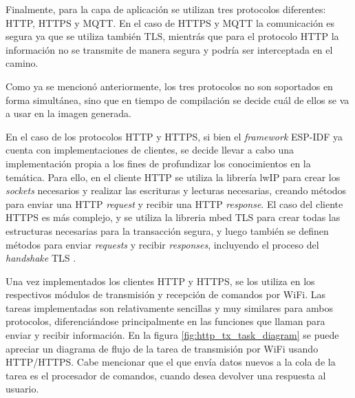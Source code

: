 Finalmente, para la capa de aplicación se utilizan tres protocolos diferentes: HTTP, HTTPS y MQTT. En el caso de HTTPS y MQTT la comunicación es segura ya que se utiliza también TLS, mientrás que para el protocolo HTTP la información no se transmite de manera segura y podría ser interceptada en el camino.

Como ya se mencionó anteriormente, los tres protocolos no son soportados en forma simultánea, sino que en tiempo de compilación se decide cuál de ellos se va a usar en la imagen generada.

En el caso de los protocolos HTTP y HTTPS, si bien el \emph{framework} ESP-IDF ya cuenta con implementaciones de clientes, se decide llevar a cabo una implementación propia a los fines de profundizar los conocimientos en la temática. Para ello, en el cliente HTTP se utiliza la librería lwIP para crear los \emph{sockets} necesarios y realizar las escrituras y lecturas necesarias, creando métodos para enviar una HTTP \emph{request} y recibir una HTTP \emph{response}. El caso del cliente HTTPS es más complejo, y se utiliza la libreria mbed TLS para crear todas las estructuras necesarias para la transacción segura, y luego también se definen métodos para enviar \emph{requests} y recibir \emph{responses}, incluyendo el proceso del \emph{handshake} TLS \citep{tls_handshake}.

Una vez implementados los clientes HTTP y HTTPS, se los utiliza en los respectivos módulos de transmisión y recepción de comandos por WiFi. Las tareas implementadas son relativamente sencillas y muy similares para ambos protocolos, diferenciándose principalmente en las funciones que llaman para enviar y recibir información. En la figura \ref{fig:http_tx_task_diagram} se puede apreciar un diagrama de flujo de la tarea de transmisión por WiFi usando HTTP/HTTPS. Cabe mencionar que el que envía datos nuevos a la cola de la tarea es el procesador de comandos, cuando desea devolver una respuesta al usuario.

